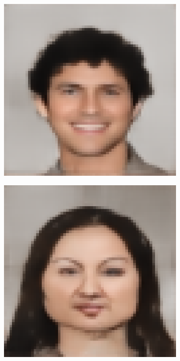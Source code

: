 \documentclass{IEEEcsmag}
\begin{document}
\begin{figure}[ht]
\begin{subfigure}{0.12\textwidth}
    \end{subfigure}
    \begin{subfigure}{0.12\textwidth}
        \includegraphics[width=\linewidth]{images/CelebA/1/cvae_5.png}
    \end{subfigure}
    \begin{subfigure}{0.12\textwidth}
        \includegraphics[width=\linewidth]{CUHK_Student/generated_images/f1-001-01-sz1.jpg_CVAE.png}

\end{subfigure}
\end{figure}
\end{document}
